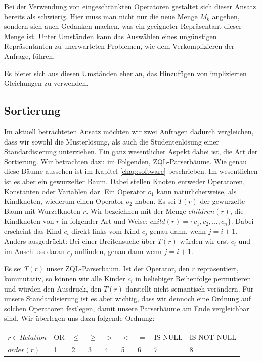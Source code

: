Bei der Verwendung von eingeschränkten Operatoren gestaltet sich dieser Ansatz bereits als schwierig. Hier muss man nicht nur die neue Menge $M_k$ angeben, sondern sich auch Gedanken machen, was ein geeigneter Repräsentant dieser Menge ist. Unter Umständen kann das Auswählen eines ungünstigen Repräsentanten zu unerwarteten Problemen, wie dem Verkomplizieren der Anfrage, führen.

Es bietet sich aus diesen Umständen eher an, das Hinzufügen von implizierten Gleichungen zu verwenden.

\subsection{Sortierung}
\label{subsec:sort}

Im aktuell betrachteten Ansatz möchten wir zwei Anfragen dadurch vergleichen, dass wir sowohl die Musterlösung, als auch die Studentenlösung einer Standardisierung unterziehen. Ein ganz wesentlicher Aspekt dabei ist, die Art der Sortierung. Wir betrachten dazu im Folgenden, ZQL-Parserbäume. Wie genau diese Bäume aussehen ist im Kapitel \ref{chap:software} beschrieben. Im wesentlichen ist es aber ein gewurzelter Baum. Dabei stellen Knoten entweder Operatoren, Konstanten oder Variablen dar. Ein Operator $o_1$ kann natürlicherweise, als Kindknoten, wiederum einen Operator $o_2$ haben. Es sei $T(r)$ der gewurzelte Baum mit Wurzelknoten $r$. Wir bezeichnen mit der Menge $\mathit{children}(r)$, die Kindknoten von $r$ in folgender Art und Weise: $\textit{child}(r) = \{c_1, c_2, ..., c_n\}$. Dabei erscheint das Kind $c_i$ direkt links vom Kind $c_j$ genau dann, wenn $j = i + 1$. Anders ausgedrückt: Bei einer Breitensuche über $T(r)$ würden wir erst $c_i$ und im Anschluss daran $c_j$ auffinden, genau dann wenn $j = i + 1$.

Es sei $T(r)$ unser ZQL-Parserbaum. Ist der Operator, den $r$ repräsentiert, kommutativ, so können wir alle Kinder $c_i$ in beliebiger Reihenfolge permutieren und würden den Ausdruck, den $T(r)$ darstellt nicht semantisch verändern. Für unsere Standardisierung ist es aber wichtig, dass wir dennoch eine Ordnung auf solchen Operatoren festlegen, damit unsere Parserbäume am Ende vergleichbar sind. Wir überlegen uns dazu folgende Ordnung: 

\begin{tabular}{|lllllllll|}
\hline
$r\in \textit{Relation}$ & OR & $\le$ & $\ge$ & $>$ & $<$ & $=$ & IS NULL & IS NOT NULL  \\
$\textit{order}(r)$ & 1 & 2 & 3 & 4 & 5 & 6 & 7 & 8\\ 
\hline
\end{tabular}\\

